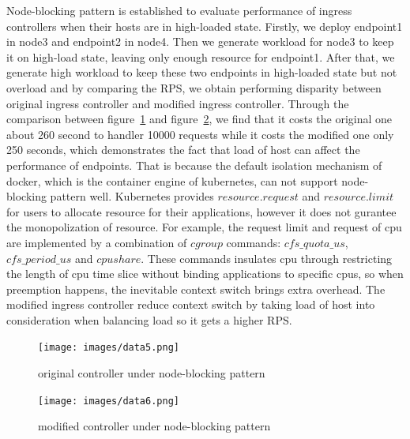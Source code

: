 Node-blocking pattern is established to evaluate performance of ingress controllers when their hosts are in high-loaded state. Firstly, we deploy endpoint1 in node3 and endpoint2 in node4. Then we generate workload for node3 to keep it on high-load state, leaving only enough resource for endpoint1. After that, we generate high workload to keep these two endpoints in high-loaded state but not overload and by comparing the RPS, we obtain performing disparity between original ingress controller and modified ingress controller. Through the comparison between figure~{\ref{fig:original_blocking}} and figure~{\ref{fig:modified_blocking}}, we find that it costs the original one about 260 second to handler 10000 requests while it costs the modified one only 250 seconds, which demonstrates the fact that load of host can affect the performance of endpoints. That is because the default isolation mechanism of docker, which is the container engine of kubernetes, can not support node-blocking pattern well. Kubernetes provides ${resource.request}$ and ${resource.limit}$ for users to allocate resource for their applications, however it does not gurantee the monopolization of resource. For example, the request limit and request of cpu are implemented by a combination of ${cgroup}$ commands: ${cfs\_quota\_us}$,${cfs\_period\_us}$ and ${cpushare}$. These commands insulates cpu through restricting the length of cpu time slice without binding applications to specific cpus, so when preemption happens, the inevitable context switch brings extra overhead. The modified ingress controller reduce context switch by taking load of host into consideration when balancing load so it gets a higher RPS.


\begin{figure}[!htb]
 \centering
 \texttt{[image: images/data5.png]}\\
 \caption{original controller under node-blocking pattern}
 \label{fig:original_blocking}
\end{figure}

\begin{figure}[!htb]
 \centering
 \texttt{[image: images/data6.png]}\\
 \caption{modified controller under node-blocking pattern}
 \label{fig:modified_blocking}
\end{figure}

